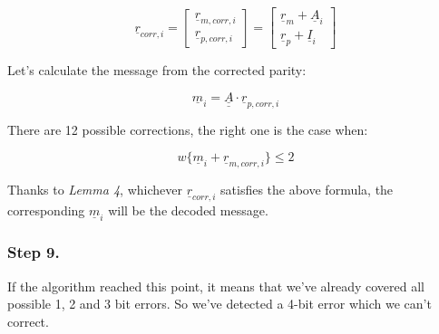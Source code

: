 \documentclass[11pt,a4paper,oneside]{report}             %
\def\doubleunderline#1{\underline{\underline{#1}}}
\def\dul#1{\doubleunderline{#1}}
\def\ul#1{\underline{#1}}
\newcommand{\vect}[2]{\begin{bmatrix} #1 \\ #2 \end{bmatrix}}
\begin{document}
\[
    \ul{r}_{corr, i} = \vect{\ul{r}_{m, corr, i}}{\ul{r}_{p, corr, i}} = \vect{\ul{r}_m + \ul{A}_i}{\ul{r}_p + \ul{I}_i}
\]

Let's calculate the message from the corrected parity:

\[
    \ul{m}_{i} = \dul{A} \cdot \ul{r}_{p, corr, i}
\]

There are 12 possible corrections, the right one is the case when:

\[
    w\{\ul{m}_{i} + \ul{r}_{m, corr, i}\} \leq 2
\]

Thanks to \emph{Lemma 4}, whichever $\ul{r}_{corr, i}$ satisfies the above formula, the corresponding $\ul{m}_{i}$  will be
the decoded message.

\subsubsection{Step 9.}

If the algorithm reached this point, it means that we've already covered all possible 1, 2 and 3 bit errors.
So we've detected a 4-bit error which we can't correct.
\end{document}

